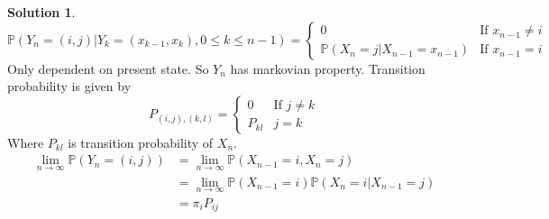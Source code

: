 \documentclass[a4paper, 10pt]{article}
\theoremstyle{definition}
\theoremstyle{hSol}
\newtheorem*{solution}{Solution}
\begin{document}
\begin{solution}
\begin{equation}
 \mathbb{P}\left(Y_n=(i,j)|Y_k=(x_{k-1},x_k), 0\leq k\leq n-1\right) = 
 \begin{cases}
 0 & \text{If $x_{n-1} \ne i$} \\
 \mathbb{P}\left(X_n=j|X_{n-1}=x_{n-1}\right) & \text{If $x_{n-1} = i$}
 \end{cases}
\end{equation} 
Only dependent on present state. So $Y_n$ has markovian property. Transition probability is given by
\begin{equation}
  P_{(i,j),(k,l)} = 
  \begin{cases}
  0 & \text{If $j\ne k$}\\
  P_{kl} & \text{$j=k$}
  \end{cases}
\end{equation}
Where $P_{kl}$ is transition probability of $X_n$. 
\begin{equation}
  \begin{split}
    \lim\limits_{n\rightarrow\infty} \mathbb{P}\left(Y_n=(i,j)\right) &= \lim\limits_{n\rightarrow\infty}\mathbb{P}\left(X_{n-1}=i, X_n = j\right)\\
    & = \lim\limits_{n\rightarrow\infty}\mathbb{P}\left(X_{n-1}=i\right) \mathbb{P}\left(X_n=i|X_{n-1}=j\right)\\
    & = \pi_i P_{ij}
  \end{split}
\end{equation}
\end{solution}
\end{document}
